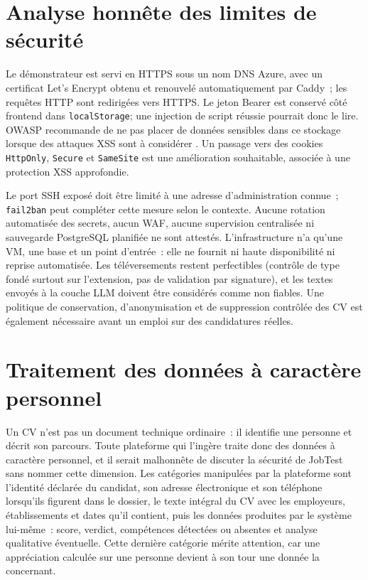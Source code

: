 \section{Analyse honnête des limites de sécurité}

Le démonstrateur est servi en HTTPS sous un nom DNS Azure, avec un certificat Let's Encrypt obtenu et renouvelé automatiquement par Caddy~; les requêtes HTTP sont redirigées vers HTTPS. Le jeton Bearer est conservé côté frontend dans \texttt{localStorage}; une injection de script réussie pourrait donc le lire. OWASP recommande de ne pas placer de données sensibles dans ce stockage lorsque des attaques XSS sont à considérer \cite{owasp_html5_storage}. Un passage vers des cookies \texttt{HttpOnly}, \texttt{Secure} et \texttt{SameSite} est une amélioration souhaitable, associée à une protection XSS approfondie.

Le port SSH exposé doit être limité à une adresse d'administration connue~; \texttt{fail2ban} peut compléter cette mesure selon le contexte. Aucune rotation automatisée des secrets, aucun WAF, aucune supervision centralisée ni sauvegarde PostgreSQL planifiée ne sont attestés. L'infrastructure n'a qu'une VM, une base et un point d'entrée~: elle ne fournit ni haute disponibilité ni reprise automatisée. Les téléversements restent perfectibles (contrôle de type fondé surtout sur l'extension, pas de validation par signature), et les textes envoyés à la couche LLM doivent être considérés comme non fiables. Une politique de conservation, d'anonymisation et de suppression contrôlée des CV est également nécessaire avant un emploi sur des candidatures réelles.

\section{Traitement des données à caractère personnel}

Un CV n'est pas un document technique ordinaire~: il identifie une personne et décrit son parcours. Toute plateforme qui l'ingère traite donc des données à caractère personnel, et il serait malhonnête de discuter la sécurité de JobTest sans nommer cette dimension. Les catégories manipulées par la plateforme sont l'identité déclarée du candidat, son adresse électronique et son téléphone lorsqu'ils figurent dans le dossier, le texte intégral du CV avec les employeurs, établissements et dates qu'il contient, puis les données produites par le système lui-même~: score, verdict, compétences détectées ou absentes et analyse qualitative éventuelle. Cette dernière catégorie mérite attention, car une appréciation calculée sur une personne devient à son tour une donnée la concernant.

